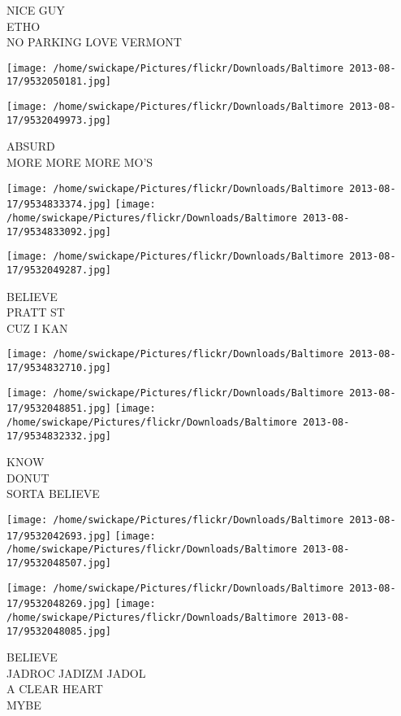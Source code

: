 \documentclass[10pt,letterpaper]{article}
\begin{document}
NICE GUY\\
ETHO\\
NO PARKING LOVE VERMONT
\pagebreak

\texttt{[image: /home/swickape/Pictures/flickr/Downloads/Baltimore 2013-08-17/9532050181.jpg]}

\vspace{0.25in}
\texttt{[image: /home/swickape/Pictures/flickr/Downloads/Baltimore 2013-08-17/9532049973.jpg]}

ABSURD\\
MORE MORE MORE MO'S
\pagebreak

\texttt{[image: /home/swickape/Pictures/flickr/Downloads/Baltimore 2013-08-17/9534833374.jpg]}
\texttt{[image: /home/swickape/Pictures/flickr/Downloads/Baltimore 2013-08-17/9534833092.jpg]}

\texttt{[image: /home/swickape/Pictures/flickr/Downloads/Baltimore 2013-08-17/9532049287.jpg]}

BELIEVE\\
PRATT ST\\
CUZ I KAN
\pagebreak

\texttt{[image: /home/swickape/Pictures/flickr/Downloads/Baltimore 2013-08-17/9534832710.jpg]}

\vspace{0.25in}
\texttt{[image: /home/swickape/Pictures/flickr/Downloads/Baltimore 2013-08-17/9532048851.jpg]}
\texttt{[image: /home/swickape/Pictures/flickr/Downloads/Baltimore 2013-08-17/9534832332.jpg]}

KNOW\\
DONUT\\
SORTA BELIEVE
\pagebreak

\texttt{[image: /home/swickape/Pictures/flickr/Downloads/Baltimore 2013-08-17/9532042693.jpg]}
\texttt{[image: /home/swickape/Pictures/flickr/Downloads/Baltimore 2013-08-17/9532048507.jpg]}

\texttt{[image: /home/swickape/Pictures/flickr/Downloads/Baltimore 2013-08-17/9532048269.jpg]}
\texttt{[image: /home/swickape/Pictures/flickr/Downloads/Baltimore 2013-08-17/9532048085.jpg]}

BELIEVE\\
JADROC JADIZM JADOL\\
A CLEAR HEART\\
MYBE
\pagebreak
\end{document}
